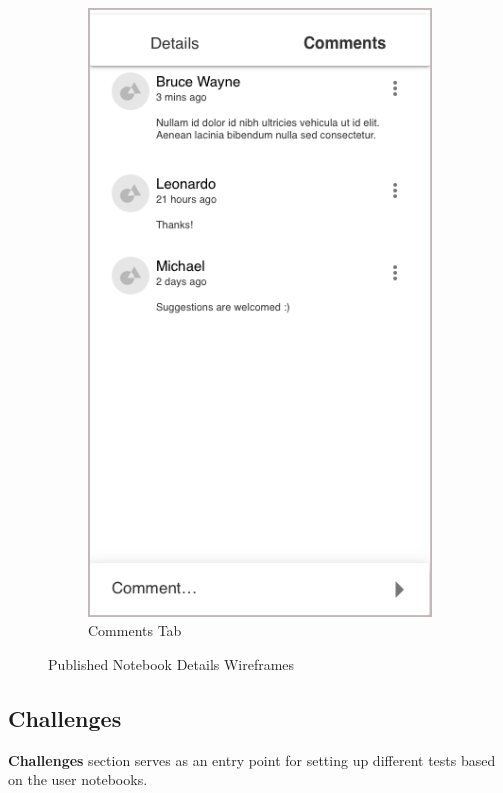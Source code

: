 \documentclass[thesis=B,english]{FITthesis}[2012/10/20]
\begin{document}
\begin{figure}[H]
\begin{subfigure}{.5\textwidth}
\end{subfigure}%
\begin{subfigure}{.5\textwidth}
  \includegraphics[scale=0.5]{details}
  \caption{Comments Tab}
  \label{fig:published-comments}
\end{subfigure}


\caption{Published Notebook Details Wireframes}
\label{fig:section-published}
\end{figure}

\subsection{Challenges}

\textbf{Challenges} section serves as an entry point for setting up different tests based on the user notebooks.
\end{document}
